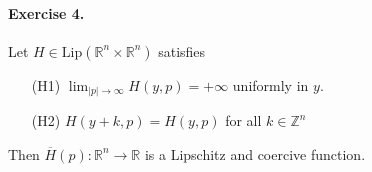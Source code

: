 \documentclass[12pt, oneside]{amsart}  	%
\begin{document}
\paragraph{\textbf{Exercise 4.}} Let $H\in \text{Lip}(\mathbb{R}^n\times \mathbb{R}^n)$ satisfies \vspace*{0.15cm}
\begin{itemize}
\item[(H1)] $\displaystyle \lim_{|p|\longrightarrow\infty} H(y,p) = +\infty$ uniformly in $y$.\vspace*{0.15cm}
\item[(H2)] $H(y+k,p) = H(y,p)$ for all $k\in \mathbb{Z}^n$\vspace*{0.15cm}
\end{itemize}
Then $\overline{H}(p):\mathbb{R}^n\longrightarrow \mathbb{R}$ is a Lipschitz and coercive function.
\end{document}
